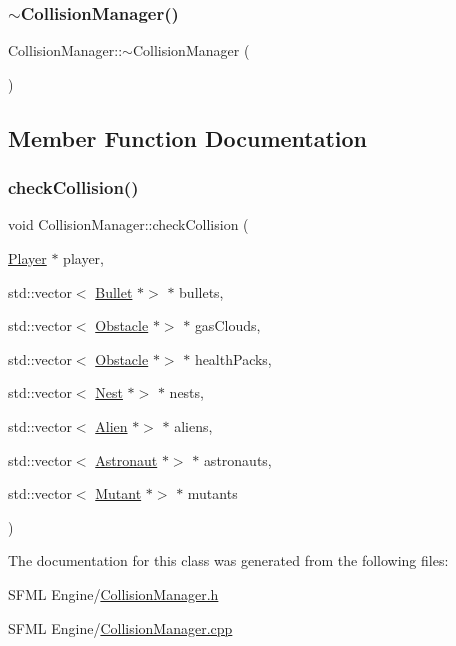 \mbox{\label{class_collision_manager_acdbb3c842f0ef1c7a028d3f080855766}} 
\subsubsection{\texorpdfstring{$\sim$\+Collision\+Manager()}{~CollisionManager()}}
{\footnotesize\ttfamily Collision\+Manager\+::$\sim$\+Collision\+Manager (\begin{DoxyParamCaption}{ }\end{DoxyParamCaption})}



\subsection{Member Function Documentation}
\mbox{\label{class_collision_manager_afc1b2d0d08aeed558617c071a68f0d98}} 
\subsubsection{\texorpdfstring{check\+Collision()}{checkCollision()}}
{\footnotesize\ttfamily void Collision\+Manager\+::check\+Collision (\begin{DoxyParamCaption}\item[{\hyperlink{class_player}{Player} $\ast$}]{player,  }\item[{std\+::vector$<$ \hyperlink{class_bullet}{Bullet} $\ast$$>$ $\ast$}]{bullets,  }\item[{std\+::vector$<$ \hyperlink{class_obstacle}{Obstacle} $\ast$$>$ $\ast$}]{gas\+Clouds,  }\item[{std\+::vector$<$ \hyperlink{class_obstacle}{Obstacle} $\ast$$>$ $\ast$}]{health\+Packs,  }\item[{std\+::vector$<$ \hyperlink{class_nest}{Nest} $\ast$$>$ $\ast$}]{nests,  }\item[{std\+::vector$<$ \hyperlink{class_alien}{Alien} $\ast$$>$ $\ast$}]{aliens,  }\item[{std\+::vector$<$ \hyperlink{class_astronaut}{Astronaut} $\ast$$>$ $\ast$}]{astronauts,  }\item[{std\+::vector$<$ \hyperlink{class_mutant}{Mutant} $\ast$$>$ $\ast$}]{mutants }\end{DoxyParamCaption})}



The documentation for this class was generated from the following files\+:\begin{DoxyCompactItemize}
\item 
S\+F\+M\+L Engine/\hyperlink{_collision_manager_8h}{Collision\+Manager.\+h}\item 
S\+F\+M\+L Engine/\hyperlink{_collision_manager_8cpp}{Collision\+Manager.\+cpp}\end{DoxyCompactItemize}
